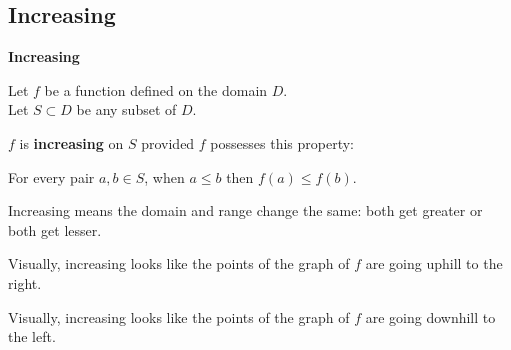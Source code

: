 \documentclass{ximera}
\begin{document}
\subsection*{Increasing}



\begin{definition} \textbf{\textcolor{green!50!black}{Increasing}} 


Let $f$ be a function defined on the domain $D$. \\
Let $S \subset D$ be any subset of $D$.

$f$ is \textbf{increasing} on $S$ provided $f$ possesses this property:  


\begin{center}
For every pair $a, b \in S$, when $a \leq b$ then $f(a) \leq f(b)$.
\end{center}

\end{definition}




\begin{idea}
Increasing means the domain and range change the same: both get greater or both get lesser.
\end{idea}



\begin{observation}
Visually, increasing looks like the points of the graph of $f$ are going uphill to the right.
\end{observation}


\begin{observation}
Visually, increasing looks like the points of the graph of $f$ are going downhill to the left.
\end{observation}





\newpage
\end{document}
